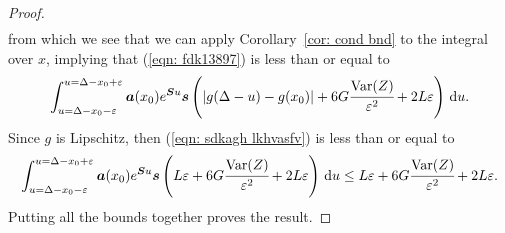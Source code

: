 \begin{proof}
\begin{align}
	\end{align}
	from which we see that we can apply Corollary~\ref{cor: cond bnd} to the integral over \(x\), implying that (\ref{eqn: fdk13897}) is less than or equal to
	\begin{align}
		\int_{u=\Delta-x_0-\varepsilon}^{u=\Delta-x_0+\varepsilon} \boldsymbol a(x_0) e^{\boldsymbol Su}\boldsymbol s\left(|g(\Delta-u)-g(x_0)|+6G\cfrac{\mathrm{Var}(Z)}{\varepsilon^2} + 2 L \varepsilon\right)\, \mathrm{d} u. \label{eqn: sdkagh lkhvasfv}
	\end{align}
	Since \(g\) is Lipschitz, then (\ref{eqn: sdkagh lkhvasfv}) is less than or equal to 
	\begin{align}
		\int_{u=\Delta-x_0-\varepsilon}^{u=\Delta-x_0+\varepsilon} \boldsymbol a(x_0) e^{\boldsymbol Su}\boldsymbol s\left(L\varepsilon+6G\cfrac{\mathrm{Var}(Z)}{\varepsilon^2} + 2 L \varepsilon\right)\, \mathrm{d} u \leq L\varepsilon+6G\cfrac{\mathrm{Var}(Z)}{\varepsilon^2} + 2 L \varepsilon. \label{eqn: sdkagh lsfv}
	\end{align}
	Putting all the bounds together proves the result. 
\end{proof}

